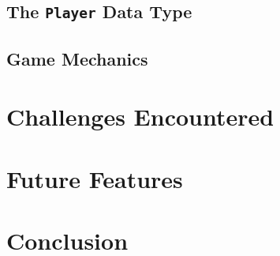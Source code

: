 \documentclass[pageno]{jpaper}
\begin{document}
\begin{doublespacing}
\hypertarget{sec:the_player_data_type}{}
\subsection{The \lstinline$Player$ Data Type}

\hypertarget{sec:game_mechanics}{}
\subsection{Game Mechanics}

\hypertarget{sec:challenges_encountered}{}
\section{Challenges Encountered}

\hypertarget{sec:future_features}{}
\section{Future Features}

\hypertarget{sec:conclusion}{}
\section{Conclusion}

\end{doublespacing} 


\end{document}
